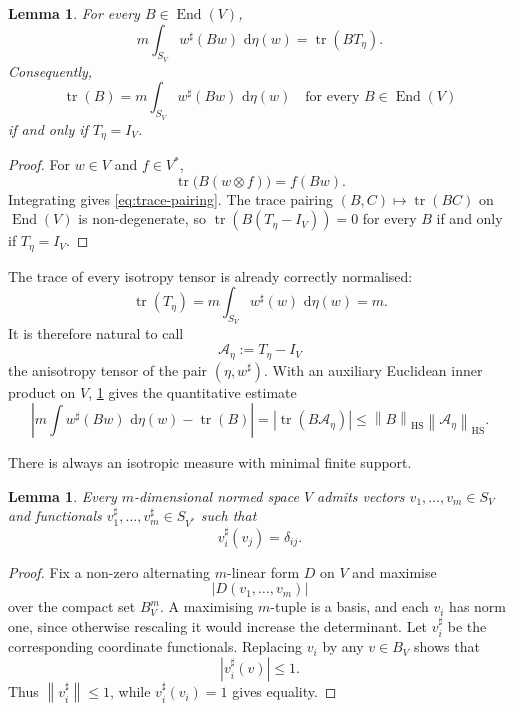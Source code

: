 \documentclass[11pt,a4paper]{amsart}
\numberwithin{equation}{section}
\theoremstyle{plain}
\newtheorem{lemma}[theorem]{Lemma}
\theoremstyle{definition}
\theoremstyle{remark}
\DeclareMathOperator{\End}{End}
\DeclareMathOperator{\tr}{tr}
\newcommand{\dd}{\,\mathrm{d}}
\newcommand{\Id}{I}
\newcommand{\abs}[1]{\left|#1\right|}
\newcommand{\norm}[1]{\left\|#1\right\|}
\begin{document}
\begin{lemma}\label{lem:trace-pairing}
For every $B\in\End(V)$,
\begin{equation}\label{eq:trace-pairing}
m\int_{S_V}w^\sharp(Bw)\,\dd\eta(w)=\tr(BT_\eta).
\end{equation}
Consequently,
\[
\tr(B)=m\int_{S_V}w^\sharp(Bw)\,\dd\eta(w)
\quad\text{for every }B\in\End(V)
\]
if and only if $T_\eta=\Id_V$.
\end{lemma}

\begin{proof}
For $w\in V$ and $f\in V^*$,
\[
\tr\big(B(w\otimes f)\big)=f(Bw).
\]
Integrating gives \eqref{eq:trace-pairing}. The trace pairing $(B,C)\mapsto\tr(BC)$ on $\End(V)$ is non-degenerate, so $\tr(B(T_\eta-\Id_V))=0$ for every $B$ if and only if $T_\eta=\Id_V$.
\end{proof}

The trace of every isotropy tensor is already correctly normalised:
\begin{equation}\label{eq:trace-T}
\tr(T_\eta)=m\int_{S_V}w^\sharp(w)\,\dd\eta(w)=m.
\end{equation}
It is therefore natural to call
\[
\mathcal A_\eta:=T_\eta-\Id_V
\]
the anisotropy tensor of the pair $(\eta,w^\sharp)$. With an auxiliary Euclidean inner product on $V$, \cref{lem:trace-pairing} gives the quantitative estimate
\begin{equation}\label{eq:HS-bound}
\left|m\int w^\sharp(Bw)\,\dd\eta(w)-\tr(B)\right|
=\abs{\tr(B\mathcal A_\eta)}
\leqslant\norm{B}_{\mathrm{HS}}\norm{\mathcal A_\eta}_{\mathrm{HS}}.
\end{equation}

There is always an isotropic measure with minimal finite support.

\begin{lemma}\label{lem:auerbach}
Every $m$-dimensional normed space $V$ admits vectors $v_1,\ldots,v_m\in S_V$ and functionals $v_1^\sharp,\ldots,v_m^\sharp\in S_{V^*}$ such that
\[
v_i^\sharp(v_j)=\delta_{ij}.
\]
\end{lemma}

\begin{proof}
Fix a non-zero alternating $m$-linear form $D$ on $V$ and maximise
\[
\abs{D(v_1,\ldots,v_m)}
\]
over the compact set $B_V^m$. A maximising $m$-tuple is a basis, and each $v_i$ has norm one, since otherwise rescaling it would increase the determinant. Let $v_i^\sharp$ be the corresponding coordinate functionals. Replacing $v_i$ by any $v\in B_V$ shows that
\[
\abs{v_i^\sharp(v)}\leqslant1.
\]
Thus $\norm{v_i^\sharp}\leqslant1$, while $v_i^\sharp(v_i)=1$ gives equality.
\end{proof}
\end{document}
